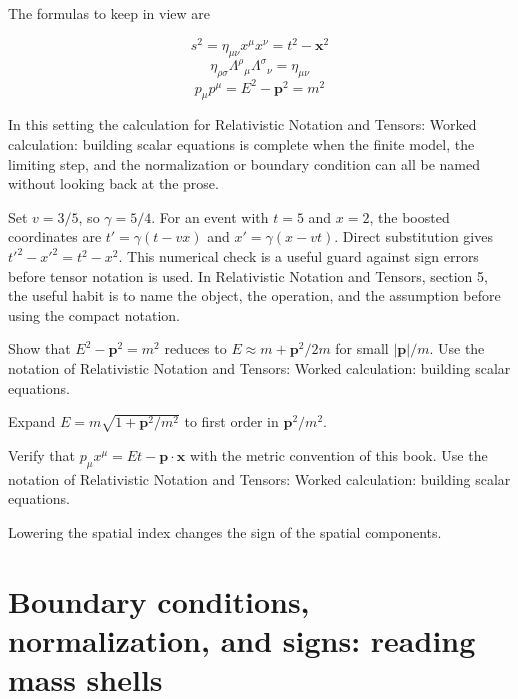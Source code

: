 The formulas to keep in view are

\[
  s^2=\eta_{\mu\nu}x^\mu x^\nu=t^2-\bm x^2
\]
\[
  \eta_{\rho\sigma}\Lambda^\rho{}_\mu\Lambda^\sigma{}_\nu=\eta_{\mu\nu}
\]
\[
  p_\mu p^\mu=E^2-\bm p^2=m^2
\]

In this setting the calculation for Relativistic Notation and Tensors: Worked calculation: building scalar equations is complete when the finite model, the limiting step, and the normalization or boundary condition can all be named without looking back at the prose.




\begin{example}
Set \(v=3/5\), so \(\gamma=5/4\).  For an event with \(t=5\) and \(x=2\), the boosted coordinates are \(t'=\gamma(t-vx)\) and \(x'=\gamma(x-vt)\).  Direct substitution gives \(t'^2-x'^2=t^2-x^2\).  This numerical check is a useful guard against sign errors before tensor notation is used.  In Relativistic Notation and Tensors, section 5, the useful habit is to name the object, the operation, and the assumption before using the compact notation.
\end{example}



\begin{exercise}
Show that \(E^2-\bm p^2=m^2\) reduces to \(E\approx m+\bm p^2/2m\) for small \(|\bm p|/m\).  Use the notation of Relativistic Notation and Tensors: Worked calculation: building scalar equations.
\begin{answer}
Expand \(E=m\sqrt{1+\bm p^2/m^2}\) to first order in \(\bm p^2/m^2\).
\end{answer}
\end{exercise}

\begin{exercise}
Verify that \(p_\mu x^\mu=Et-\bm p\cdot\bm x\) with the metric convention of this book.  Use the notation of Relativistic Notation and Tensors: Worked calculation: building scalar equations.
\begin{answer}
Lowering the spatial index changes the sign of the spatial components.
\end{answer}
\end{exercise}



\section{Boundary conditions, normalization, and signs: reading mass shells}


